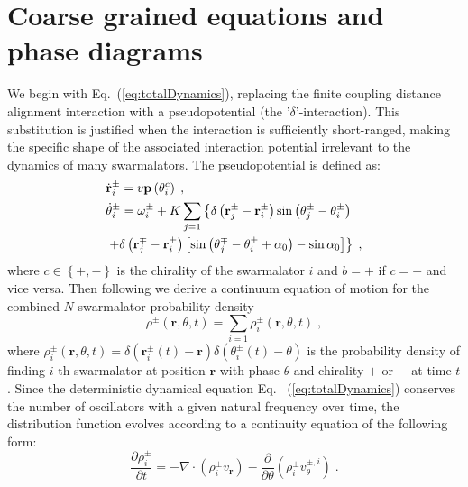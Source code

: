 \documentclass{article}
\begin{document}
\section{\label{sec:analysis}Coarse grained equations and phase diagrams}

We begin with Eq.~(\ref{eq:totalDynamics}), replacing the finite coupling distance alignment interaction with a pseudopotential (the '$\delta$'-interaction). This substitution is justified when the interaction is sufficiently short-ranged, making the specific shape of the associated interaction potential irrelevant to the dynamics of many swarmalators. The pseudopotential is defined as:
\begin{subequations}
    \begin{align}
        &\dot{\mathbf{r}}_{i}^{\pm}=v\mathbf{p}\left( \theta _{i}^{c} \right) \;,\\
        &\dot{\theta}_{i}^{\pm}=\omega _{i}^{\pm}+K\sum_{j=1}{\left\{ \delta \left( \mathbf{r}_{j}^{\pm}-\mathbf{r}_{i}^{\pm} \right) \sin \left( \theta _{j}^{\pm}-\theta _{i}^{\pm} \right) \right.}\notag\\
        &\left. +\delta \left( \mathbf{r}_{j}^{\mp}-\mathbf{r}_{i}^{\pm} \right) \left[ \sin \left( \theta _{j}^{\mp}-\theta _{i}^{\pm}+\alpha _0 \right) -\sin \alpha _0 \right] \right\} \;,
    \end{align}
\end{subequations}
where $c\in\left\{+,-\right\}$ is the chirality of the swarmalator $i$ and $b=+$ if $c=-$ and vice versa.  
Then following \cite{David_S_Dean_1996} we derive a continuum equation of motion for the combined $N$-swarmalator probability density
\begin{equation}
    \label{eq:globalContinuityDef}
    \rho ^{\pm}\left( \mathbf{r},\theta ,t \right) =\sum_{i=1}{\rho _{i}^{\pm}\left( \mathbf{r},\theta ,t \right)}\;,
\end{equation}
where $\rho _{i}^{\pm}\left( \mathbf{r},\theta ,t \right) =\delta \left( \mathbf{r}_{i}^{\pm}\left( t \right) -\mathbf{r} \right) \delta \left( \theta _{i}^{\pm}\left( t \right) -\theta \right)$ is the probability density of finding $i$-th swarmalator at position $\mathbf{r}$ with phase $\theta$ and chirality $+$ or $-$ at time $t$.
Since the deterministic dynamical equation Eq.~ (\ref{eq:totalDynamics}) conserves the number of oscillators with a given natural frequency over time, the distribution function evolves according to a continuity equation of the following form:
\begin{equation}
    \frac{\partial \rho _{i}^{\pm}}{\partial t}=-\nabla \cdot \left( \rho _{i}^{\pm}v_{\mathbf{r}} \right) -\frac{\partial}{\partial \theta}\left( \rho _{i}^{\pm}v_{\theta}^{\pm ,i} \right) \;.
    \label{eq:singleContinuity}
\end{equation}
\end{document}
